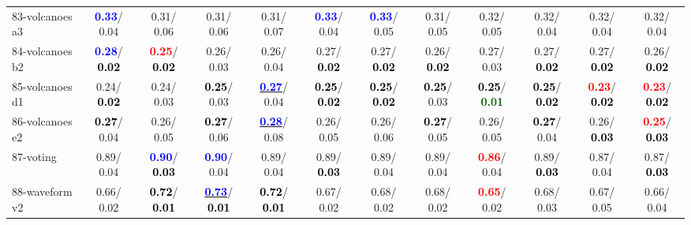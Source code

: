 \begin{table}[h]
\begin{center}
{\begin{tabular}{lc|c|c|c|c|c|c|c|c|c|c}
83-volcanoes a3 & \textcolor{blue}{\textbf{  0.33}}/  0.04 &   0.31/  0.06 &   0.31/  0.06 &   0.31/  0.07 & \textcolor{blue}{\textbf{  0.33}}/  0.04 & \textcolor{blue}{\textbf{  0.33}}/  0.05 &   0.31/  0.05 &   0.32/  0.05 &   0.32/  0.04 &   0.32/  0.04 &   0.32/  0.04 \\
84-volcanoes b2 & \textcolor{blue}{\textbf{  0.28}}/\textcolor{black}{\textbf{  0.02}} & \textcolor{red}{\textbf{  0.25}}/\textcolor{black}{\textbf{  0.02}} &   0.26/  0.03 &   0.26/  0.04 &   0.27/\textcolor{black}{\textbf{  0.02}} &   0.27/\textcolor{black}{\textbf{  0.02}} &   0.26/\textcolor{black}{\textbf{  0.02}} &   0.27/  0.03 &   0.27/\textcolor{black}{\textbf{  0.02}} &   0.27/\textcolor{black}{\textbf{  0.02}} &   0.26/\textcolor{black}{\textbf{  0.02}} \\
85-volcanoes d1 &   0.24/\textcolor{black}{\textbf{  0.02}} &   0.24/  0.03 & \textcolor{black}{\textbf{  0.25}}/  0.03 & \underline{\textcolor{blue}{\textbf{  0.27}}}/  0.04 & \textcolor{black}{\textbf{  0.25}}/\textcolor{black}{\textbf{  0.02}} & \textcolor{black}{\textbf{  0.25}}/\textcolor{black}{\textbf{  0.02}} & \textcolor{black}{\textbf{  0.25}}/  0.03 & \textcolor{black}{\textbf{  0.25}}/\textcolor{darkgreen}{\textbf{  0.01}} & \textcolor{black}{\textbf{  0.25}}/\textcolor{black}{\textbf{  0.02}} & \textcolor{red}{\textbf{  0.23}}/\textcolor{black}{\textbf{  0.02}} & \textcolor{red}{\textbf{  0.23}}/\textcolor{black}{\textbf{  0.02}} \\ \hline
86-volcanoes e2 & \textcolor{black}{\textbf{  0.27}}/  0.04 &   0.26/  0.05 & \textcolor{black}{\textbf{  0.27}}/  0.06 & \underline{\textcolor{blue}{\textbf{  0.28}}}/  0.08 &   0.26/  0.05 &   0.26/  0.06 & \textcolor{black}{\textbf{  0.27}}/  0.05 &   0.26/  0.05 & \textcolor{black}{\textbf{  0.27}}/  0.04 &   0.26/\textcolor{black}{\textbf{  0.03}} & \textcolor{red}{\textbf{  0.25}}/\textcolor{black}{\textbf{  0.03}} \\
87-voting &   0.89/  0.04 & \textcolor{blue}{\textbf{  0.90}}/\textcolor{black}{\textbf{  0.03}} & \textcolor{blue}{\textbf{  0.90}}/  0.04 &   0.89/  0.04 &   0.89/\textcolor{black}{\textbf{  0.03}} &   0.89/  0.04 &   0.89/  0.04 & \textcolor{red}{\textbf{  0.86}}/  0.04 &   0.89/\textcolor{black}{\textbf{  0.03}} &   0.87/  0.04 &   0.87/\textcolor{black}{\textbf{  0.03}} \\
88-waveform v2 &   0.66/  0.02 & \textcolor{black}{\textbf{  0.72}}/\textcolor{black}{\textbf{  0.01}} & \underline{\textcolor{blue}{\textbf{  0.73}}}/\textcolor{black}{\textbf{  0.01}} & \textcolor{black}{\textbf{  0.72}}/\textcolor{black}{\textbf{  0.01}} &   0.67/  0.02 &   0.68/  0.02 &   0.68/  0.02 & \textcolor{red}{\textbf{  0.65}}/  0.02 &   0.68/  0.03 &   0.67/  0.05 &   0.66/  0.04 \\

\end{tabular}}
\end{center}
\end{table}
